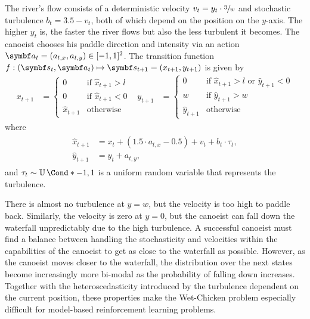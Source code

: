 The river's flow consists of a deterministic velocity $v_t = y_t \cdot \sfrac{3}{w}$ and stochastic turbulence $b_t = 3.5 - v_t$, both of which depend on the position on the $y$-axis.
The higher $y_t$ is, the faster the river flows but also the less turbulent it becomes.
The canoeist chooses his paddle direction and intensity via an action $\mat{a}_t = (a_{t,x}, a_{t,y}) \in [-1, 1]^2$.
The transition function $f : (\mat{s}_t, \mat{a}_t) \mapsto \mat{s}_{t+1} = (x_{t+1}, y_{t+1})$ is given by
\begin{align}
    x_{t+1} & = \begin{cases}
        0             & \text{if } \hat{x}_{t+1} > l \\
        0             & \text{if } \hat{x}_{t+1} < 0 \\
        \hat{x}_{t+1} & \text{otherwise}
    \end{cases} &
    y_{t+1} & = \begin{cases}
        0             & \text{if } \hat{x}_{t+1} > l \text{ or } \hat{y}_{t+1} < 0 \\
        w             & \text{if } \hat{y}_{t+1} > w                               \\
        \hat{y}_{t+1} & \text{otherwise}
    \end{cases}
\end{align}
where
\begin{align}
    \begin{split}
        \hat{x}_{t+1} &= x_t + (1.5 \cdot a_{t, x} - 0.5)  + v_t + b_t \cdot \tau_t, \\
        \hat{y}_{t+1} &= y_t + a_{t, y},
    \end{split}
\end{align}
and $\tau_t \sim \Fun*{\Uni}{-1, 1}$ is a uniform random variable that represents the turbulence.

There is almost no turbulence at $y = w$, but the velocity is too high to paddle back.
Similarly, the velocity is zero at $y = 0$, but the canoeist can fall down the waterfall unpredictably due to the high turbulence.
A successful canoeist must find a balance between handling the stochasticity and velocities within the capabilities of the canoeist to get as close to the waterfall as possible.
However, as the canoeist moves closer to the waterfall, the distribution over the next states become increasingly more bi-modal as the probability of falling down increases.
Together with the heteroscedasticity introduced by the turbulence dependent on the current position, these properties make the Wet-Chicken problem especially difficult for model-based reinforcement learning problems.


